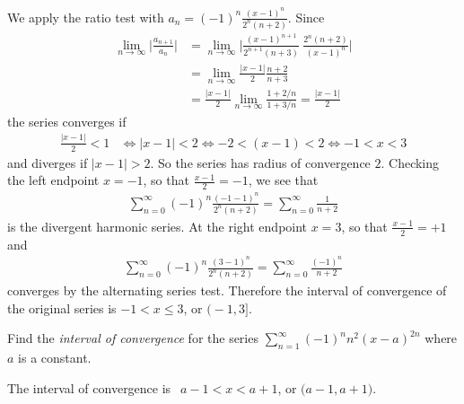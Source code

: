 \begin{solution}
We apply the ratio test with $a_n= (-1)^n\frac{(x-1)^n}{2^n(n+2)}$.
Since
\begin{align*}
\lim_{n\to\infty} \bigg| \frac{a_{n+1}}{a_n} \bigg|
&= \lim_{n\to\infty} \bigg| \frac{(x-1)^{n+1}}{2^{n+1}(n+3)}\
                            \frac{2^n(n+2)}{(x-1)^n} \bigg| \\
&= \lim_{n\to\infty} \frac{|x-1|}{2} \frac{n+2}{n+3} \\
&= \frac{|x-1|}{2} \lim_{n\to\infty} \frac{1+2/n}{1+3/n} = \frac{|x-1|}{2}
\end{align*}
the series converges if
\begin{align*}
\frac{|x-1|}{2}<1
&\iff |x-1|<2
\iff -2<(x-1)<2
\iff -1<x<3
\end{align*}
and diverges if $|x-1|>2$. So the series has radius of convergence $2$.
Checking the left endpoint $x=-1$, so that $\frac{x-1}{2}=-1$,
we see that
\begin{align*}
\sum_{n=0}^\infty (-1)^n\frac{(-1-1)^n}{2^n(n+2)}
= \sum_{n=0}^\infty \frac{1}{n+2}
\end{align*}
is the divergent harmonic series. At the right endpoint $x=3$,
so that $\frac{x-1}{2}=+1$ and
\begin{align*}
\sum_{n=0}^\infty (-1)^n\frac{(3-1)^n}{2^n(n+2)}
= \sum_{n=0}^\infty \frac{(-1)^n}{n+2}
\end{align*}
converges by the alternating series test. Therefore the interval of convergence of the
original series is $-1< x\le 3$, or $\big(-1,3\big]$.

\end{solution}


\begin{question}[2014D]
Find the \emph{interval of convergence} for the series
$\displaystyle \sum_{n=1}^\infty (-1)^n n^2(x-a)^{2n}$
where $a$ is a constant.
\end{question}


\begin{answer}
The interval of convergence  is $\ \ a-1< x<a+1$,
or $\big(a-1,a+1\big)$.
\end{answer}

